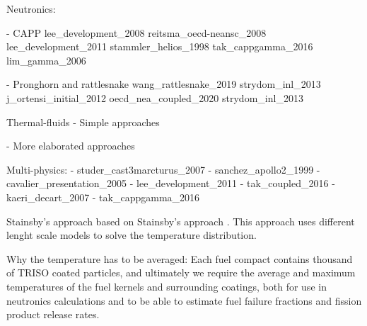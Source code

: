Neutronics:

- CAPP
lee_development_2008
reitsma_oecd-neansc_2008
lee_development_2011
stammler_helios_1998
tak_cappgamma_2016
lim_gamma_2006

- Pronghorn and rattlesnake
wang_rattlesnake_2019
strydom_inl_2013
j_ortensi_initial_2012
oecd_nea_coupled_2020
strydom_inl_2013

Thermal-fluids
- Simple approaches

- More elaborated approaches


Multi-physics:
- studer_cast3marcturus_2007
- sanchez_apollo2_1999
- cavalier_presentation_2005
- lee_development_2011
- tak_coupled_2016
- kaeri_decart_2007
- tak_cappgamma_2016

















Stainsby's approach
based on Stainsby's approach \cite{stainsby_investigation_2008}.
This approach uses different lenght scale models to solve the temperature distribution.


Why the temperature has to be averaged:
Each fuel compact contains thousand of TRISO coated particles, and ultimately we require the average and maximum temperatures of the fuel kernels and surrounding coatings, both for use in neutronics calculations and to be able to estimate fuel failure fractions and fission product release rates.